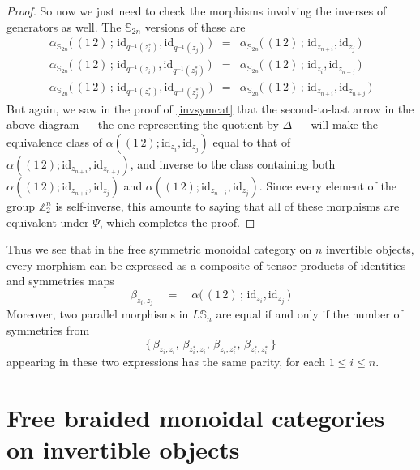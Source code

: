 \documentclass{amsbook} %
\numberwithin{section}{chapter}
\begin{document}
\begin{proof}
So now we just need to check the morphisms involving the inverses of generators as well. The $\mathbb{S}_{2n}$ versions of these are
\[ \begin{array}{rll}
			\alpha_{\mathbb{S}_{2n}}\big( \, (1 \, 2) \, ; \, \mathrm{id}_{q^{-1}(z_i^*)}, \mathrm{id}_{q^{-1}(z_j)} \, \big) & = & \alpha_{\mathbb{S}_{2n}}\big( \, (1 \, 2) \, ; \, \mathrm{id}_{z_{n+i}}, \mathrm{id}_{z_j} \, \big) \\
			\alpha_{\mathbb{S}_{2n}}\big( \, (1 \, 2) \, ; \, \mathrm{id}_{q^{-1}(z_i)}, \mathrm{id}_{q^{-1}(z_j^*)} \, \big) & = & \alpha_{\mathbb{S}_{2n}}\big( \, (1 \, 2) \, ; \, \mathrm{id}_{z_i}, \mathrm{id}_{z_{n+j}} \, \big) \\
			\alpha_{\mathbb{S}_{2n}}\big( \, (1 \, 2) \, ; \, \mathrm{id}_{q^{-1}(z_i^*)}, \mathrm{id}_{q^{-1}(z_j^*)} \, \big) & = & \alpha_{\mathbb{S}_{2n}}\big( \, (1 \, 2) \, ; \, \mathrm{id}_{z_{n+i}}, \mathrm{id}_{z_{n+j}} \, \big)
		\end{array}
\]
But again, we saw in the proof of \cref{invsymcat} that the second-to-last arrow in the above diagram --- the one representing the quotient by $\Delta$ --- will make the equivalence class of $\alpha((1 \, 2);\mathrm{id}_{z_i}, \mathrm{id}_{z_j})$ equal to that of $\alpha((1 \, 2); \mathrm{id}_{z_{n+i}}, \mathrm{id}_{z_{n+j}})$, and inverse to the class containing both $\alpha((1 \, 2); \mathrm{id}_{z_{n+i}}, \mathrm{id}_{z_j})$ and $\alpha((1 \, 2); \mathrm{id}_{z_{n+i}}, \mathrm{id}_{z_j})$. Since every element of the group $\mathbb{Z}_2^{n}$ is self-inverse, this amounts to saying that all of these morphisms are equivalent under $\Psi$, which completes the proof. 
\end{proof}

Thus we see that in the free symmetric monoidal category on $n$ invertible objects, every morphism can be expressed as a composite of tensor products of identities and symmetries maps
\[ \beta_{z_i, z_j} \quad = \quad \alpha\big( \, (1 \, 2) \, ; \, \mathrm{id}_{z_i}, \mathrm{id}_{z_j} \, \big) \]
Moreover, two parallel morphisms in $L\mathbb{S}_n$ are equal if and only if the number of symmetries from
\[ \big\{ \, \beta_{z_i, z_i}, \, \beta_{z_i^*, z_i}, \, \beta_{z_i, z_i^*}, \, \beta_{z_i^*, z_i^*} \, \big\} \]
appearing in these two expressions has the same parity, for each $1 \le i \le n$.

\section{Free braided monoidal categories on invertible objects} 
\end{document}
